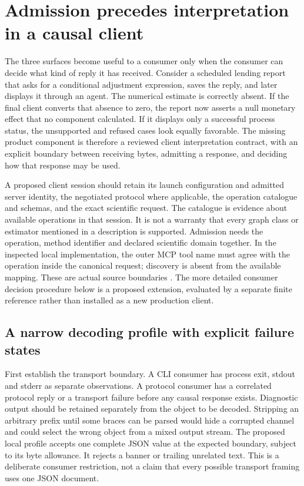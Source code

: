 \section{Admission precedes interpretation in a causal client}
\label{exec17:i2-admission}

The three surfaces become useful to a consumer only when the consumer can
decide what kind of reply it has received. Consider a scheduled lending
report that asks for a conditional adjustment expression, saves the reply,
and later displays it through an agent. The numerical estimate is correctly
absent. If the final client converts that absence to zero, the report now
asserts a null monetary effect that no component calculated. If it displays
only a successful process status, the unsupported and refused cases look
equally favorable. The missing product component is therefore a reviewed
client interpretation contract, with an explicit boundary between receiving
bytes, admitting a response, and deciding how that response may be used.

A proposed client session should retain its launch configuration and admitted
server identity, the negotiated protocol where applicable, the operation
catalogue and schemas, and the exact scientific request. The catalogue is
evidence about available operations in that session. It is not a warranty
that every graph class or estimator mentioned in a description is supported.
Admission needs the operation, method identifier and declared scientific
domain together. In the inspected local implementation, the outer MCP tool
name must agree with the operation inside the canonical request; discovery
is absent from the available mapping. These are actual source boundaries
\citep{exec13_i2_examples}. The more detailed consumer decision procedure
below is a proposed extension, evaluated by a separate finite reference
rather than installed as a new production client.

\subsection{A narrow decoding profile with explicit failure states}

First establish the transport boundary. A CLI consumer has process exit,
stdout and stderr as separate observations. A protocol consumer has a
correlated protocol reply or a transport failure before any causal response
exists. Diagnostic output should be retained separately from the object to
be decoded. Stripping an arbitrary prefix until some braces can be parsed
would hide a corrupted channel and could select the wrong object from a
mixed output stream. The proposed local profile accepts one complete JSON
value at the expected boundary, subject to its byte allowance. It rejects a
banner or trailing unrelated text. This is a deliberate consumer restriction,
not a claim that every possible transport framing uses one JSON document.

